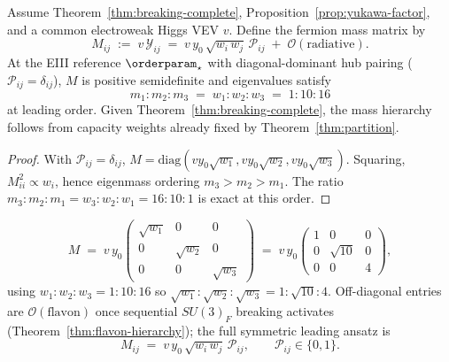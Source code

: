 \begin{theorem}\label{thm:yukawa-mass}
Assume Theorem~\ref{thm:breaking-complete}, Proposition~\ref{prop:yukawa-factor},
and a common electroweak Higgs VEV $v$. Define the fermion mass matrix by
\begin{equation}\label{eq:mass-matrix-def}
  M_{ij}
  \;:=\;
  v\,\mathcal{Y}_{ij}
  \;=\;
  v\,y_0\,\sqrt{w_i\,w_j}\,\mathcal{P}_{ij}
  \;+\;\mathcal{O}(\text{radiative}).
\end{equation}
At the EIII reference $\orderparam_\star$ with diagonal-dominant hub pairing
($\mathcal{P}_{ij}=\delta_{ij}$), $M$ is positive semidefinite and
eigenvalues satisfy
\begin{equation}\label{eq:mass-eigenvalues}
  m_1:m_2:m_3 \;=\; w_1:w_2:w_3 \;=\; 1:10:16
\end{equation}
at leading order. Given Theorem~\ref{thm:breaking-complete}, the mass hierarchy
follows from capacity weights already fixed by Theorem~\ref{thm:partition}.
\end{theorem}

\begin{proof}
With $\mathcal{P}_{ij}=\delta_{ij}$, $M=\mathrm{diag}(v y_0\sqrt{w_1},
v y_0\sqrt{w_2}, v y_0\sqrt{w_3})$. Squaring,
$M_{ii}^2\propto w_i$, hence eigenmass ordering $m_3>m_2>m_1$. The ratio
$m_3:m_2:m_1=w_3:w_2:w_1=16:10:1$ is exact at this order.
\end{proof}

\begin{equation}\label{eq:mass-matrix-explicit}
  M
  \;=\;
  v\,y_0
  \begin{pmatrix}
    \sqrt{w_1} & 0 & 0 \\
    0 & \sqrt{w_2} & 0 \\
    0 & 0 & \sqrt{w_3}
  \end{pmatrix}
  \;=\;
  v\,y_0
  \begin{pmatrix}
    1 & 0 & 0 \\
    0 & \sqrt{10} & 0 \\
    0 & 0 & 4
  \end{pmatrix},
\end{equation}
using $w_1:w_2:w_3=1:10:16$ so $\sqrt{w_1}:\sqrt{w_2}:\sqrt{w_3}=1:\sqrt{10}:4$.
Off-diagonal entries are $\mathcal{O}(\text{flavon})$ once sequential
$SU(3)_F$ breaking activates (Theorem~\ref{thm:flavon-hierarchy}); the full
symmetric leading ansatz is
\begin{equation}\label{eq:mass-matrix-full}
  M_{ij} \;=\; v\,y_0\,\sqrt{w_i\,w_j}\,\mathcal{P}_{ij},
  \qquad
  \mathcal{P}_{ij}\in\{0,1\}.
\end{equation}

